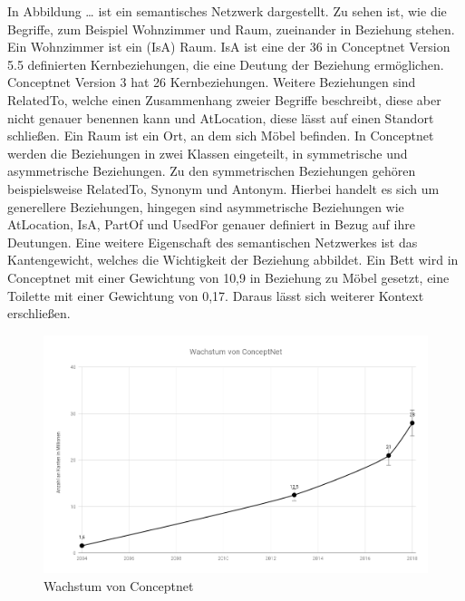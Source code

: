 In Abbildung … ist ein semantisches Netzwerk dargestellt. Zu sehen ist, wie die Begriffe, zum Beispiel Wohnzimmer und Raum, zueinander in Beziehung stehen. Ein Wohnzimmer ist ein (IsA) Raum. IsA ist eine der 36 in Conceptnet Version 5.5 definierten Kernbeziehungen, die eine Deutung der Beziehung ermöglichen. Conceptnet Version 3 hat 26 Kernbeziehungen\cite{havasi2007conceptnet}. Weitere Beziehungen sind RelatedTo, welche einen Zusammenhang zweier Begriffe beschreibt, diese aber nicht genauer benennen kann und AtLocation, diese lässt auf einen Standort schließen. Ein Raum ist ein Ort, an dem sich Möbel befinden. 
In Conceptnet werden die Beziehungen in zwei Klassen eingeteilt, in symmetrische und asymmetrische Beziehungen. Zu den symmetrischen Beziehungen gehören beispielsweise RelatedTo, Synonym und Antonym. Hierbei handelt es sich um generellere Beziehungen, hingegen sind asymmetrische Beziehungen wie AtLocation, IsA, PartOf und UsedFor genauer definiert in Bezug auf ihre Deutungen. Eine weitere Eigenschaft des semantischen Netzwerkes ist das Kantengewicht, welches die Wichtigkeit der Beziehung abbildet. Ein Bett wird in Conceptnet mit einer Gewichtung von 10,9 in Beziehung zu Möbel gesetzt, eine Toilette mit einer Gewichtung von 0,17. Daraus lässt sich weiterer Kontext erschließen. 

\begin{figure}[h]
	
	\begin{center}
		
		\includegraphics[width=16cm]{images/Wachstum_von_ConceptNet.png}
		
		\caption{Wachstum von Conceptnet}
		
		\label{wachstum_cn}
		
	\end{center}
	
	
\end{figure}


